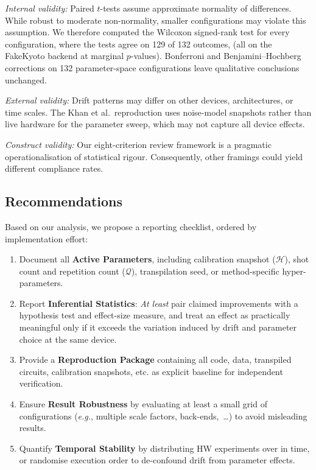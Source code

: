 \documentclass[10pt,conference]{IEEEtran}
\newcommand{\eg}{\emph{e.g.}\xspace}
\begin{document}
\emph{Internal validity:} Paired $t$-tests assume approximate normality of differences. While robust to moderate non-normality, smaller configurations may violate this assumption. We therefore computed the Wilcoxon signed-rank test for every configuration, where the tests agree on 129 of 132 outcomes, (all on the FakeKyoto backend at marginal $p$-values). Bonferroni and Benjamini--Hochberg corrections on 132 parameter-space configurations leave qualitative conclusions unchanged.

\emph{External validity:} Drift patterns may differ on other devices, architectures, or time scales. The Khan et al.\ reproduction uses noise-model snapshots rather than live hardware for the parameter sweep, which may not capture all device effects. 

\emph{Construct validity:} Our eight-criterion review framework is a pragmatic operationalisation of statistical rigour. Consequently, other framings could yield different compliance rates.

\subsection{Recommendations}
Based on our analysis, we propose a reporting checklist, ordered by implementation effort:
\begin{enumerate}[nosep,leftmargin=*]
  \item Document all \textbf{Active Parameters}, including calibration snapshot ($\mathcal{H}$), shot count and repetition count ($\mathcal{Q}$), transpilation seed, or method-specific hyper-parameters.
  \item Report \textbf{Inferential Statistics}: \emph{At least} pair claimed improvements with a hypothesis test and 
  effect-size measure, and treat an effect as practically meaningful only if it exceeds the variation induced by drift and parameter choice at the same device.
  \item Provide a \textbf{Reproduction Package} containing all code, data, transpiled circuits, calibration snapshots, etc. as explicit baseline for independent verification.
  \item Ensure \textbf{Result Robustness} by evaluating at least a small grid of configurations (\eg, multiple scale factors, back-ends,~\dots) to avoid misleading results.
  \item Quantify \textbf{Temporal Stability} by distributing HW experiments over in time, or randomise execution order to de-confound drift from parameter effects.
\end{enumerate}
\end{document}
